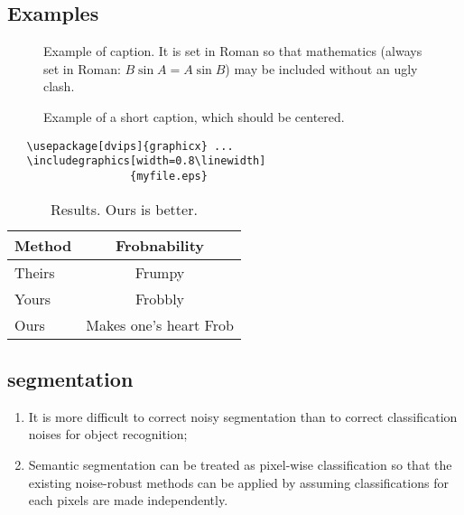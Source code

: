 \subsection{Examples}

\begin{figure}[t]
\begin{center}
\fbox{\rule{0pt}{2in} \rule{0.9\linewidth}{0pt}}
\end{center}
   \caption{Example of caption.  It is set in Roman so that mathematics
   (always set in Roman: $B \sin A = A \sin B$) may be included without an
   ugly clash.}
\label{fig:long}
\label{fig:onecol}
\end{figure}


\begin{figure*}
\begin{center}
\fbox{\rule{0pt}{2in} \rule{.9\linewidth}{0pt}}
\end{center}
   \caption{Example of a short caption, which should be centered.}
\label{fig:short}
\end{figure*}


{\small\begin{verbatim}
   \usepackage[dvips]{graphicx} ...
   \includegraphics[width=0.8\linewidth]
                   {myfile.eps}
\end{verbatim}
}

\begin{table}
\begin{center}
\begin{tabular}{|l|c|}
\hline
Method & Frobnability \\
\hline\hline
Theirs & Frumpy \\
Yours & Frobbly \\
Ours & Makes one's heart Frob\\
\hline
\end{tabular}
\end{center}
\caption{Results.   Ours is better.}
\end{table}


\subsection{segmentation}

\begin{enumerate}
  \item It is more difficult to correct noisy segmentation than to correct classification noises for object recognition;
  \item Semantic segmentation can be treated as pixel-wise classification so that the existing noise-robust methods can be applied by assuming classifications for each pixels are made independently.
\end{enumerate}


